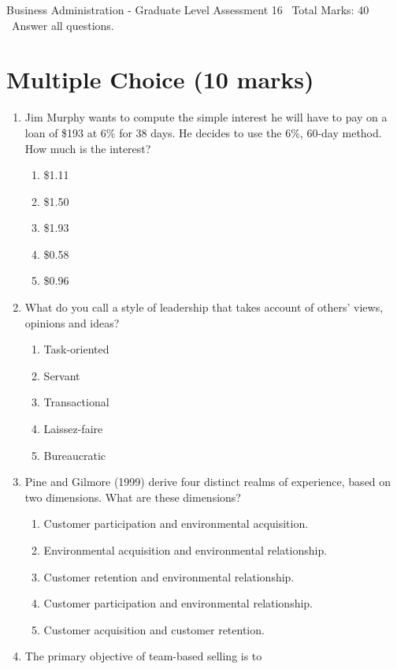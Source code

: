 \documentclass[12pt]{article}
\begin{document}
\begin{center}
Business Administration - Graduate Level Assessment 16 \
Total Marks: 40 \
Answer all questions.
\end{center}

\section*{Multiple Choice (10 marks)}
\begin{enumerate}[label=\arabic*.]
\item Jim Murphy wants to compute the simple interest he will have to pay on a loan of \$193 at 6\% for 38 days. He decides to use the 6\%, 60-day method. How much is the interest?
\begin{enumerate}[label=(\alph*)]
    \item \$1.11
    \item \$1.50
    \item \$1.93
    \item \$0.58
    \item \$0.96
\end{enumerate}
\item What do you call a style of leadership that takes account of others' views, opinions and ideas?
\begin{enumerate}[label=(\alph*)]
    \item Task-oriented
    \item Servant
    \item Transactional
    \item Laissez-faire
    \item Bureaucratic
\end{enumerate}
\item Pine and Gilmore (1999) derive four distinct realms of experience, based on two dimensions. What are these dimensions?
\begin{enumerate}[label=(\alph*)]
    \item Customer participation and environmental acquisition.
    \item Environmental acquisition and environmental relationship.
    \item Customer retention and environmental relationship.
    \item Customer participation and environmental relationship.
    \item Customer acquisition and customer retention.
\end{enumerate}
\item The primary objective of team-based selling is to

\end{enumerate}
\end{document}
